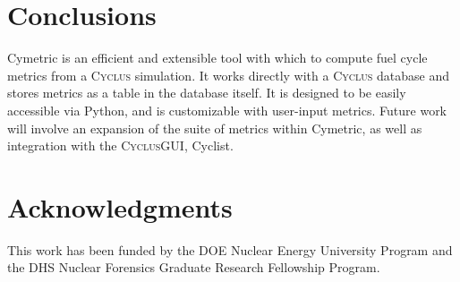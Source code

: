 \documentclass{anstrans}
\newcommand{\cyclus}{\textsc{Cyclus}\xspace}
\begin{document}
\section{Conclusions}

Cymetric is an efficient and extensible tool with which to compute fuel cycle metrics from a \cyclus simulation. 
It works directly with a \cyclus database and stores metrics as a table in the database itself. 
It is designed to be easily accessible via Python, and is customizable with user-input metrics. 
Future work will involve an expansion of the suite of metrics within Cymetric, as well as 
integration with the \cyclus \gls{GUI}, Cyclist. \cite{livnat_cyclist_2014}

\section{Acknowledgments}
This work has been funded by the \gls{DOE} Nuclear Energy University Program and 
the \gls{DHS} Nuclear Forensics Graduate Research Fellowship Program. 



\end{document}
